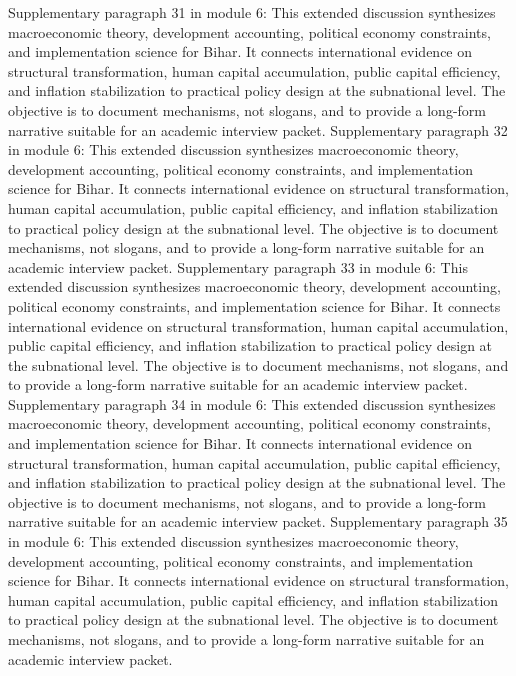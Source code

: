 \documentclass[preprint,12pt]{elsarticle}
\begin{document}
Supplementary paragraph 31 in module 6: This extended discussion synthesizes macroeconomic theory, development accounting, political economy constraints, and implementation science for Bihar. It connects international evidence on structural transformation, human capital accumulation, public capital efficiency, and inflation stabilization to practical policy design at the subnational level. The objective is to document mechanisms, not slogans, and to provide a long-form narrative suitable for an academic interview packet.
Supplementary paragraph 32 in module 6: This extended discussion synthesizes macroeconomic theory, development accounting, political economy constraints, and implementation science for Bihar. It connects international evidence on structural transformation, human capital accumulation, public capital efficiency, and inflation stabilization to practical policy design at the subnational level. The objective is to document mechanisms, not slogans, and to provide a long-form narrative suitable for an academic interview packet.
Supplementary paragraph 33 in module 6: This extended discussion synthesizes macroeconomic theory, development accounting, political economy constraints, and implementation science for Bihar. It connects international evidence on structural transformation, human capital accumulation, public capital efficiency, and inflation stabilization to practical policy design at the subnational level. The objective is to document mechanisms, not slogans, and to provide a long-form narrative suitable for an academic interview packet.
Supplementary paragraph 34 in module 6: This extended discussion synthesizes macroeconomic theory, development accounting, political economy constraints, and implementation science for Bihar. It connects international evidence on structural transformation, human capital accumulation, public capital efficiency, and inflation stabilization to practical policy design at the subnational level. The objective is to document mechanisms, not slogans, and to provide a long-form narrative suitable for an academic interview packet.
Supplementary paragraph 35 in module 6: This extended discussion synthesizes macroeconomic theory, development accounting, political economy constraints, and implementation science for Bihar. It connects international evidence on structural transformation, human capital accumulation, public capital efficiency, and inflation stabilization to practical policy design at the subnational level. The objective is to document mechanisms, not slogans, and to provide a long-form narrative suitable for an academic interview packet.
\end{document}
